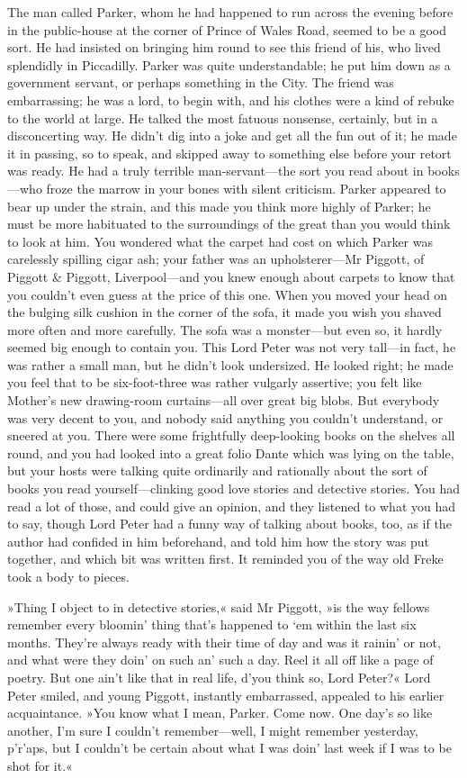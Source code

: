 The man called Parker, whom he had happened to run across the evening before in the public-house at the corner of Prince of Wales Road, seemed to be a good sort. He had insisted on bringing him round to see this friend of his, who lived splendidly in Piccadilly. Parker was quite understandable; he put him down as a government servant, or perhaps something in the City. The friend was embarrassing; he was a lord, to begin with, and his clothes were a kind of rebuke to the world at large. He talked the most fatuous nonsense, certainly, but in a disconcerting way. He didn't dig into a joke and get all the fun out of it; he made it in passing, so to speak, and skipped away to something else before your retort was ready. He had a truly terrible man-servant—the sort you read about in books—who froze the marrow in your bones with silent criticism. Parker appeared to bear up under the strain, and this made you think more highly of Parker; he must be more habituated to the surroundings of the great than you would think to look at him. You wondered what the carpet had cost on which Parker was carelessly spilling cigar ash; your father was an upholsterer—Mr Piggott, of Piggott \& Piggott, Liverpool—and you knew enough about carpets to know that you couldn't even guess at the price of this one. When you moved your head on the bulging silk cushion in the corner of the sofa, it made you wish you shaved more often and more carefully. The sofa was a monster—but even so, it hardly seemed big enough to contain you. This Lord Peter was not very tall—in fact, he was rather a small man, but he didn't look undersized. He looked right; he made you feel that to be six-foot-three was rather vulgarly assertive; you felt like Mother's new drawing-room curtains—all over great big blobs. But everybody was very decent to you, and nobody said anything you couldn't understand, or sneered at you. There were some frightfully deep-looking books on the shelves all round, and you had looked into a great folio Dante which was lying on the table, but your hosts were talking quite ordinarily and rationally about the sort of books you read yourself—clinking good love stories and detective stories. You had read a lot of those, and could give an opinion, and they listened to what you had to say, though Lord Peter had a funny way of talking about books, too, as if the author had confided in him beforehand, and told him how the story was put together, and which bit was written first. It reminded you of the way old Freke took a body to pieces.

»Thing I object to in detective stories,« said Mr Piggott, »is the way fellows remember every bloomin' thing that's happened to `em within the last six months. They're always ready with their time of day and was it rainin' or not, and what were they doin' on such an' such a day. Reel it all off like a page of poetry. But one ain't like that in real life, d'you think so, Lord Peter?« Lord Peter smiled, and young Piggott, instantly embarrassed, appealed to his earlier acquaintance. »You know what I mean, Parker. Come now. One day's so like another, I'm sure I couldn't remember—well, I might remember yesterday, p'r'aps, but I couldn't be certain about what I was doin' last week if I was to be shot for it.«

